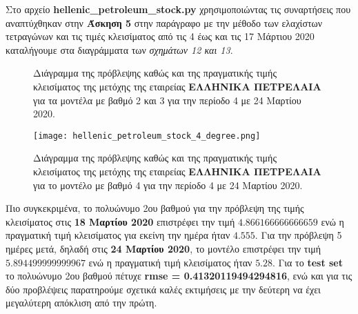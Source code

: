 \documentclass[Second Project.tex]{subfiles}
\begin{document}
Στο αρχείο \textlatin{\textbf{hellenic\_petroleum\_stock.py}} χρησιμοποιώντας τις συναρτήσεις που αναπτύχθηκαν στην 
\textbf{Άσκηση 5} στην παράγραφο με την μέθοδο των ελαχίστων τετραγώνων και τις τιμές κλεισίματος από τις 4 έως 
και τις 17 Μάρτιου 2020 καταλήγουμε στα διαγράμματα των \textit{σχημάτων 12 και 13}.
\begin{figure}[h!]
    \centering
    \captionsetup{justification=centering}
    \quad
    \caption{ Διάγραμμα της πρόβλεψης καθώς και της πραγματικής τιμής κλεισίματος της μετόχης της εταιρείας 
    \textbf{ΕΛΛΗΝΙΚΑ ΠΕΤΡΕΛΑΙΑ} για τα μοντέλα με βαθμό 2 και 3 για την περίοδο 4 με 24 Μαρτίου 2020. }
\end{figure}
\vspace{10px}
\begin{figure}[h!]
    \centering
    \captionsetup{justification=centering}
    \begin{center}
        \texttt{[image: hellenic\_petroleum\_stock\_4\_degree.png]}    
        \caption{Διάγραμμα της πρόβλεψης καθώς και της πραγματικής τιμής κλεισίματος της μετόχης της εταιρείας 
        \textbf{ΕΛΛΗΝΙΚΑ ΠΕΤΡΕΛΑΙΑ} για το μοντέλο με βαθμό 4 για την περίοδο 4 με 24 Μαρτίου 2020.}
    \end{center}
\end{figure}

Πιο συγκεκριμένα, το πολυώνυμο 2ου βαθμού για την πρόβλεψη της τιμής κλεισίματος στις \textbf{18 Μαρτίου 2020} 
επιστρέφει την τιμή $4.866166666666659$ ενώ η πραγματική τιμή κλεισίματος για εκείνη την ημέρα ήταν
$4.555$. Για την πρόβλεψη 5 ημέρες μετά, δηλαδή στις \textbf{24 Μαρτίου 2020}, το μοντέλο επιστρέφει την τιμή 
$5.894499999999967$ ενώ η πραγματική τιμή κλεισίματος ήταν $5.28$. Για το \textlatin{\textbf{test set}} το
πολυώνυμο 2ου βαθμού πέτυχε \textbf{\textlatin{rmse} = 0.41320119494294816}, ενώ και για τις δύο προβλέψεις 
παρατηρούμε σχετικά καλές εκτιμήσεις με την δεύτερη να έχει μεγαλύτερη απόκλιση από την πρώτη. 
\end{document}
